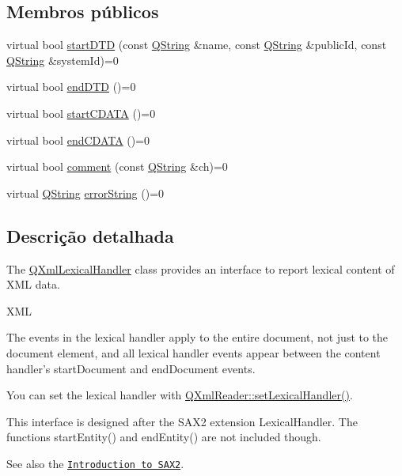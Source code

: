 \subsection*{Membros públicos}
\begin{DoxyCompactItemize}
\item 
virtual bool \hyperlink{class_q_xml_lexical_handler_a2ea9d9ea737aebf275346d81eea3e2b7}{start\-D\-T\-D} (const \hyperlink{class_q_string}{Q\-String} \&name, const \hyperlink{class_q_string}{Q\-String} \&public\-Id, const \hyperlink{class_q_string}{Q\-String} \&system\-Id)=0
\item 
virtual bool \hyperlink{class_q_xml_lexical_handler_a418bba370ca7d74563c7e66c55c54631}{end\-D\-T\-D} ()=0
\item 
virtual bool \hyperlink{class_q_xml_lexical_handler_af94092d3d1e27e2616d4d8ec3ac94b40}{start\-C\-D\-A\-T\-A} ()=0
\item 
virtual bool \hyperlink{class_q_xml_lexical_handler_af4e24c106522bb67c6fac75aed4924e3}{end\-C\-D\-A\-T\-A} ()=0
\item 
virtual bool \hyperlink{class_q_xml_lexical_handler_a89f4a1fa0b8b370c7c8a9666011bd60e}{comment} (const \hyperlink{class_q_string}{Q\-String} \&ch)=0
\item 
virtual \hyperlink{class_q_string}{Q\-String} \hyperlink{class_q_xml_lexical_handler_ac86bbbabef3a52aec7615cbbc0adb3f4}{error\-String} ()=0
\end{DoxyCompactItemize}


\subsection{Descrição detalhada}
The \hyperlink{class_q_xml_lexical_handler}{Q\-Xml\-Lexical\-Handler} class provides an interface to report lexical content of X\-M\-L data. 

X\-M\-L

The events in the lexical handler apply to the entire document, not just to the document element, and all lexical handler events appear between the content handler's start\-Document and end\-Document events.

You can set the lexical handler with \hyperlink{class_q_xml_reader_a5d8760a6bd5b439c78a1c2d925e0ba7f}{Q\-Xml\-Reader\-::set\-Lexical\-Handler()}.

This interface is designed after the S\-A\-X2 extension Lexical\-Handler. The functions start\-Entity() and end\-Entity() are not included though.

See also the \href{xml.html#introSAX2}{\tt Introduction to S\-A\-X2}.

